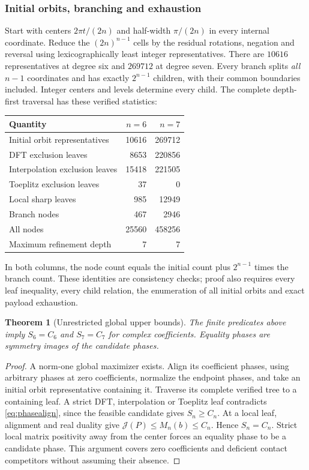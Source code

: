 \documentclass[11pt]{article}
\newtheorem{theorem}{Theorem}[section]
\newcommand{\J}{\mathcal J}
\begin{document}
\subsubsection{Initial orbits, branching and exhaustion}
Start with centers $2\pi t/(2n)$ and half-width $\pi/(2n)$ in every
internal coordinate. Reduce the $(2n)^{n-1}$ cells by the residual
rotations, negation and reversal using lexicographically least integer
representatives. There are $10616$ representatives at degree six and
$269712$ at degree seven. Every branch splits \emph{all} $n-1$
coordinates and has exactly $2^{n-1}$ children, with their common
boundaries included. Integer centers and levels determine every child.
The complete depth-first traversal has these verified statistics:
\begin{center}\small
\begin{tabular}{lrr}
\toprule Quantity&$n=6$&$n=7$\\\midrule
Initial orbit representatives&10616&269712\\
DFT exclusion leaves&8653&220856\\
Interpolation exclusion leaves&15418&221505\\
Toeplitz exclusion leaves&37&0\\
Local sharp leaves&985&12949\\
Branch nodes&467&2946\\
All nodes&25560&458256\\
Maximum refinement depth&7&7\\\bottomrule
\end{tabular}
\end{center}
In both columns, the node count equals the initial count plus
$2^{n-1}$ times the branch count. These identities are consistency
checks; proof also requires every leaf inequality, every child relation,
the enumeration of all initial orbits and exact payload exhaustion.

\begin{theorem}[Unrestricted global upper bounds]\label{thm:global67}
The finite predicates above imply $S_6=C_6$ and $S_7=C_7$ for complex
coefficients. Equality phases are symmetry images of the candidate phases.
\end{theorem}
\begin{proof}
A norm-one global maximizer exists. Align its coefficient phases, using
arbitrary phases at zero coefficients, normalize the endpoint phases,
and take an initial orbit representative containing it. Traverse its
complete verified tree to a containing leaf. A strict DFT, interpolation
or Toeplitz leaf contradicts \eqref{eq:phasealign}, since the feasible
candidate gives $S_n\ge C_n$. At a local leaf, alignment and real duality
give $\J(P)\le M_n(b)\le C_n$. Hence $S_n=C_n$. Strict local matrix
positivity away from the center forces an equality phase to be a
candidate phase. This argument covers zero coefficients and deficient
contact competitors without assuming their absence.
\end{proof}
\end{document}
